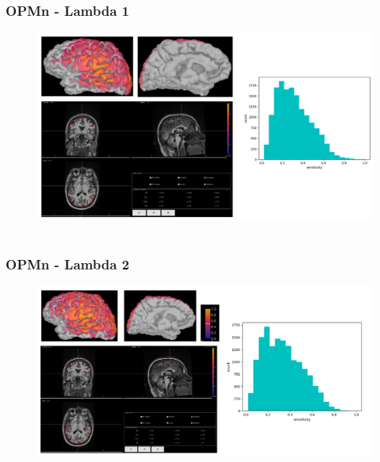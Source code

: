\documentclass{beamer}
\numberwithin{figure}{section}
\numberwithin{equation}{section}
\begin{document}
\section{}
\begin{frame}
 \frametitle{OPMn - Lambda 1}
	\begin{figure}[p]
  		\centering
  		\includegraphics[width=1\linewidth]{pictures/opmsen00}
  		\label{fig:approaches_RDF}
 	\end{figure}

  
\end{frame}

\section{}
\begin{frame}
 \frametitle{OPMn - Lambda 2}
	\begin{figure}[p]
  		\centering
  		\includegraphics[width=1\linewidth]{pictures/opmsen11}
  		\label{fig:approaches_RDF}
 	\end{figure}

  
\end{frame}
\end{document}
